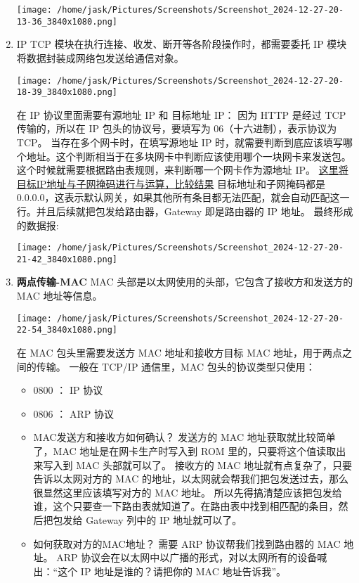 \documentclass[11pt]{article}
\begin{document}
\begin{enumerate}
\begin{center}
\texttt{[image: /home/jask/Pictures/Screenshots/Screenshot\_2024-12-27-20-13-36\_3840x1080.png]}
\end{center}
\item IP
TCP 模块在执行连接、收发、断开等各阶段操作时，都需要委托 IP 模块将数据封装成网络包发送给通信对象。
\begin{center}
\texttt{[image: /home/jask/Pictures/Screenshots/Screenshot\_2024-12-27-20-18-39\_3840x1080.png]}
\end{center}
在 IP 协议里面需要有源地址 IP 和 目标地址 IP：
因为 HTTP 是经过 TCP 传输的，所以在 IP 包头的协议号，要填写为 06（十六进制），表示协议为 TCP。
当存在多个网卡时，在填写源地址 IP 时，就需要判断到底应该填写哪个地址。这个判断相当于在多块网卡中判断应该使用哪个一块网卡来发送包。
这个时候就需要根据路由表规则，来判断哪一个网卡作为源地址 IP。
\uline{这里将目标IP地址与子网掩码进行与运算，比较结果}
目标地址和子网掩码都是 0.0.0.0，这表示默认网关，如果其他所有条目都无法匹配，就会自动匹配这一行。并且后续就把包发给路由器，Gateway 即是路由器的 IP 地址。
最终形成的数据报:
\begin{center}
\texttt{[image: /home/jask/Pictures/Screenshots/Screenshot\_2024-12-27-20-21-42\_3840x1080.png]}
\end{center}
\item \textbf{两点传输-MAC}
MAC 头部是以太网使用的头部，它包含了接收方和发送方的 MAC 地址等信息。
\begin{center}
\texttt{[image: /home/jask/Pictures/Screenshots/Screenshot\_2024-12-27-20-22-54\_3840x1080.png]}
\end{center}
在 MAC 包头里需要发送方 MAC 地址和接收方目标 MAC 地址，用于两点之间的传输。
一般在 TCP/IP 通信里，MAC 包头的协议类型只使用：
\begin{itemize}
\item 0800 ： IP 协议
\item 0806 ： ARP 协议
\item MAC发送方和接收方如何确认？
发送方的 MAC 地址获取就比较简单了，MAC 地址是在网卡生产时写入到 ROM 里的，只要将这个值读取出来写入到 MAC 头部就可以了。
接收方的 MAC 地址就有点复杂了，只要告诉以太网对方的 MAC 的地址，以太网就会帮我们把包发送过去，那么很显然这里应该填写对方的 MAC 地址。
所以先得搞清楚应该把包发给谁，这个只要查一下路由表就知道了。在路由表中找到相匹配的条目，然后把包发给 Gateway 列中的 IP 地址就可以了。
\item 如何获取对方的MAC地址？
需要 ARP 协议帮我们找到路由器的 MAC 地址。
ARP 协议会在以太网中以广播的形式，对以太网所有的设备喊出：“这个 IP 地址是谁的？请把你的 MAC 地址告诉我”。

\end{itemize}
\end{enumerate}
\end{document}
